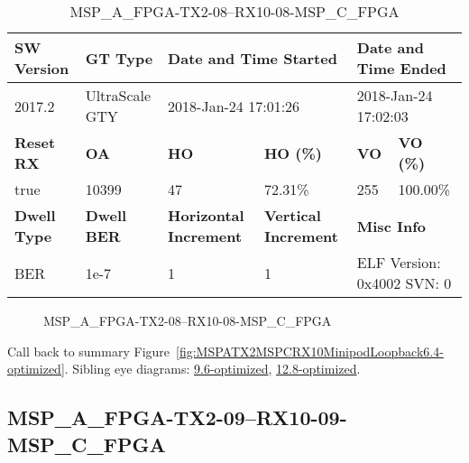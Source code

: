 \begin{table}[h]
\centering
\caption{MSP\_A\_FPGA-TX2-08--RX10-08-MSP\_C\_FPGA}
\label{tab:MSPAFPGATX208RX1008MSPCFPGA6.4-optimized}
\begin{tabular}{@{}|l|l|l|l|l|l|@{}}
\toprule
\textbf{SW Version}                & \textbf{GT Type}   & \multicolumn{2}{l|}{\textbf{Date and Time Started}}            & \multicolumn{2}{l|}{\textbf{Date and Time Ended}}        \\ \midrule
2017.2                       & UltraScale GTY          & \multicolumn{2}{l|}{2018-Jan-24 17:01:26}                   & \multicolumn{2}{l|}{2018-Jan-24 17:02:03}               \\ \midrule
\textbf{Reset RX}                  & \textbf{OA} & \textbf{HO}   & \textbf{HO (\%)} & \textbf{VO} & \textbf{VO (\%)} \\ \midrule
true & 10399        & 47          & 72.31\%        & 255        & 100.00\%       \\ \midrule
\textbf{Dwell Type}                & \textbf{Dwell BER} & \textbf{Horizontal Increment} & \textbf{Vertical Increment}    & \multicolumn{2}{l|}{\textbf{Misc Info}}                  \\ \midrule
BER                            & 1e-7        & 1        & 1           & \multicolumn{2}{l|}{ELF Version: 0x4002 SVN: 0}                         \\ \bottomrule
\end{tabular}
\end{table}

\begin{figure}[h]
\caption{MSP\_A\_FPGA-TX2-08--RX10-08-MSP\_C\_FPGA} \label{fig:MSPAFPGATX208RX1008MSPCFPGA6.4-optimized}
\end{figure}

Call back to summary Figure~\ref{fig:MSPATX2MSPCRX10MinipodLoopback6.4-optimized}.
Sibling eye diagrams: \hyperref[sec:MSPAFPGATX208RX1008MSPCFPGA9.6-optimized]{9.6-optimized}, \hyperref[sec:MSPAFPGATX208RX1008MSPCFPGA12.8-optimized]{12.8-optimized}.

\clearpage
\newpage


\subsection{MSP\_A\_FPGA-TX2-09--RX10-09-MSP\_C\_FPGA}\label{sec:MSPAFPGATX209RX1009MSPCFPGA6.4-optimized}

